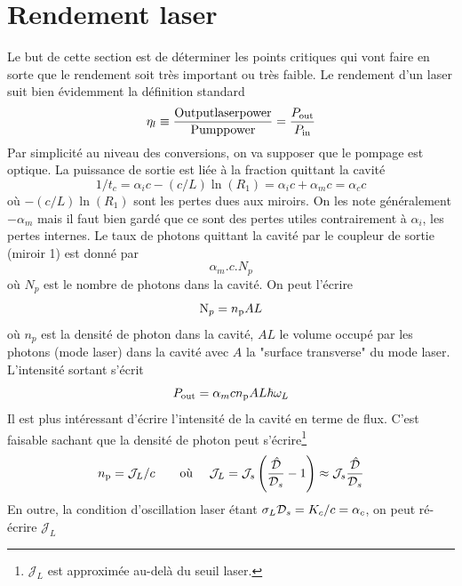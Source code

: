 \section{Rendement laser}
Le but de cette section est de déterminer les points critiques qui vont faire en sorte que le 
rendement soit très important ou très faible. Le rendement d'un laser suit bien évidemment la définition standard
\begin{equation}
{\eta _l} \equiv \frac{{{\rm{Output laser power}}}}{{{\rm{Pump power}}}} = \frac{{{P_{{\rm{out}}}}}}{{{P_{{\rm{in}}}}}}
\end{equation}
Par simplicité au niveau des conversions, on va supposer que le pompage est optique. La puissance 
de sortie est liée à la fraction quittant la cavité
\begin{equation}
1/{t_c} = {\alpha _i}c - (c/L)\ln ({R_1}) = {\alpha _i}c + {\alpha _m}c = {\alpha _c}c
\end{equation}
où $- (c/L)\ln ({R_1})$ sont les pertes dues aux miroirs. On les note généralement $-\alpha_m$ mais 
il faut bien gardé que ce sont des pertes utiles contrairement à $\alpha_i$, les pertes internes. 
Le taux de photons quittant la cavité par le coupleur de sortie (miroir 1) est donné par\begin{equation}
\alpha_m.c.N_p
\end{equation}
où $N_p$ est le nombre de photons dans la cavité. On peut l'écrire
\begin{equation}
{{\rm{N}}_p} = {n_{\rm{p}}}AL
\end{equation}
où $n_p$ est la densité de photon dans la cavité, $AL$ le volume occupé par les photons (mode laser) 
dans la cavité avec $A$ la "surface transverse" du mode laser. L'intensité sortant s'écrit 
\begin{equation}
{P_{{\rm{out}}}} = {\alpha _m}c{n_{\rm{p}}}AL\hbar {\omega _L}
\end{equation}
Il est plus intéressant d'écrire l'intensité de la cavité en terme de flux. C'est faisable sachant 
que la densité de photon peut s'écrire\footnote{$\mathcal{J}_L$ est approximée au-delà du seuil 
laser.}
\begin{equation}
{n_{\rm{p}}} = {{{\cal J}}_L}/c\qquad\text{où }\quad {{{\cal J}}_L} = {{{\cal J}}_s}\left(\frac{{{\hat {\cal D}}}}{{{{{\cal D}}_s}}} - 1\right) \approx {{{\cal J}}_s}\frac{{{\hat {\cal D}}}}{{{{{\cal D}}_s}}}
\end{equation}
En outre, la condition d'oscillation laser étant ${\sigma _L}{{{\cal D}}_s} = {K_c}/c = {\alpha _c}$, 
on peut ré-écrire $\mathcal{J}_L$
